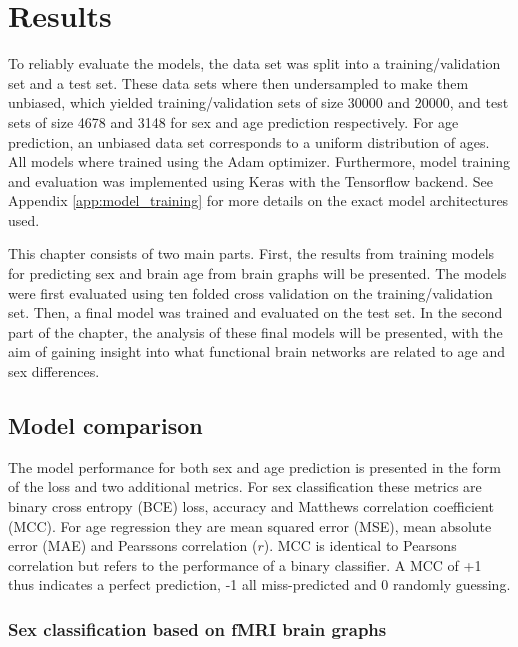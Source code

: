 \chapter{Results}


To reliably evaluate the models, the data set was split into a training/validation set and a test set. These data sets where then undersampled to make them unbiased, which yielded training/validation sets of size 30000 and 20000, and test sets of size  4678 and 3148 for sex and age prediction respectively. For age prediction, an unbiased data set corresponds to a uniform distribution of ages. All models where trained using the Adam optimizer. Furthermore, model training and evaluation was implemented using Keras with the Tensorflow backend. See Appendix \ref{app:model_training} for more details on the exact model architectures used. 

This chapter consists of two main parts. First, the results from training models for predicting sex and brain age from brain graphs will be presented. The models were first evaluated using ten folded cross validation on the training/validation set. Then, a final model was trained and evaluated on the test set. In the second part of the chapter, the analysis of these final models will be presented, with the aim of gaining insight into what functional brain networks are related to age and sex differences. 


\section{Model comparison}
\label{sec:model_pred}
The model performance for both sex and age prediction is presented in the form of the loss and two additional metrics. For sex classification these metrics are binary cross entropy (BCE) loss, accuracy and Matthews correlation coefficient (MCC). For age regression they are mean squared error (MSE), mean absolute error (MAE) and Pearssons correlation ($r$). MCC is identical to Pearsons correlation but refers to the performance of a binary classifier. A MCC of +1 thus indicates a perfect prediction, -1 all miss-predicted and 0 randomly guessing.

\subsection{Sex classification based on fMRI brain graphs}

